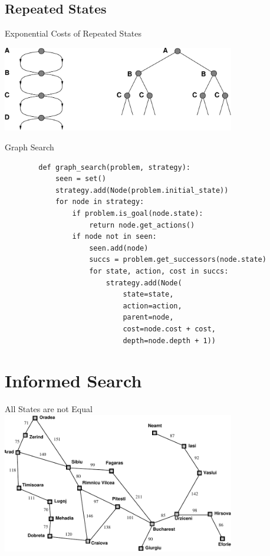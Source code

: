\documentclass[14pt]{beamer}
\begin{document}
\subsection*{Repeated States}
\begin{frame}{Exponential Costs of Repeated States}
	\begin{center}
		\includegraphics[width=4in]{ribbon-space.pdf}
	\end{center}
\end{frame}
\begin{frame}[fragile]{Graph Search}
	\scriptsize
	\begin{lstlisting}
		def graph_search(problem, strategy):
		    seen = set()
		    strategy.add(Node(problem.initial_state))
		    for node in strategy:
		        if problem.is_goal(node.state):
		            return node.get_actions()
		        if node not in seen:
		            seen.add(node)
		            succs = problem.get_successors(node.state)
		            for state, action, cost in succs:
		                strategy.add(Node(
		                    state=state,
		                    action=action,
		                    parent=node,
		                    cost=node.cost + cost,
		                    depth=node.depth + 1))
	\end{lstlisting}
\end{frame}

\section{Informed Search}
\begin{frame}{All States are not Equal}
	\includegraphics[width=4in]{romania-distances.pdf}
\end{frame}
\end{document}
